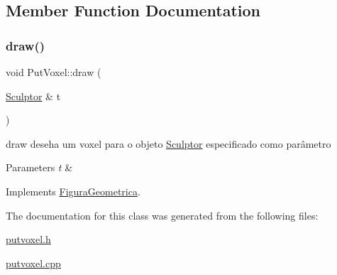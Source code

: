 \subsection{Member Function Documentation}
\mbox{\label{class_put_voxel_af784ab77d8a7aac2010e608796710ccb}} 
\subsubsection{\texorpdfstring{draw()}{draw()}}
{\footnotesize\ttfamily void Put\+Voxel\+::draw (\begin{DoxyParamCaption}\item[{\hyperlink{class_sculptor}{Sculptor} \&}]{t }\end{DoxyParamCaption})\hspace{0.3cm}{\ttfamily [virtual]}}



draw deseha um voxel para o objeto \hyperlink{class_sculptor}{Sculptor} especificado como parâmetro 


\begin{DoxyParams}{Parameters}
{\em t} & \\
\hline
\end{DoxyParams}


Implements \hyperlink{class_figura_geometrica_a34585fd7c0bd7378fc69c4ee208e676c}{Figura\+Geometrica}.



The documentation for this class was generated from the following files\+:\begin{DoxyCompactItemize}
\item 
\hyperlink{putvoxel_8h}{putvoxel.\+h}\item 
\hyperlink{putvoxel_8cpp}{putvoxel.\+cpp}\end{DoxyCompactItemize}
